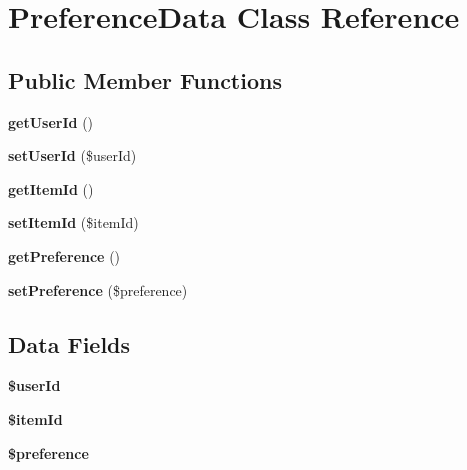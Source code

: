 \hypertarget{class_preference_data}{\section{Preference\+Data Class Reference}
\label{class_preference_data}
}
\subsection*{Public Member Functions}
\begin{DoxyCompactItemize}
\item 
\hypertarget{class_preference_data_a05f6aa1ffae6295260d9f1cca016bf33}{{\bfseries get\+User\+Id} ()}\label{class_preference_data_a05f6aa1ffae6295260d9f1cca016bf33}

\item 
\hypertarget{class_preference_data_aad3264e2196ea03403e62460cd62ff96}{{\bfseries set\+User\+Id} (\$user\+Id)}\label{class_preference_data_aad3264e2196ea03403e62460cd62ff96}

\item 
\hypertarget{class_preference_data_a5b01110117f0cd71a5a115dc8b9eab6f}{{\bfseries get\+Item\+Id} ()}\label{class_preference_data_a5b01110117f0cd71a5a115dc8b9eab6f}

\item 
\hypertarget{class_preference_data_a22de7a673c95892b16b497788139add1}{{\bfseries set\+Item\+Id} (\$item\+Id)}\label{class_preference_data_a22de7a673c95892b16b497788139add1}

\item 
\hypertarget{class_preference_data_a7e7b1aa2f3a60fa96075c163926faae5}{{\bfseries get\+Preference} ()}\label{class_preference_data_a7e7b1aa2f3a60fa96075c163926faae5}

\item 
\hypertarget{class_preference_data_abaceff2adf3ae4d727cb718a455aa72c}{{\bfseries set\+Preference} (\$preference)}\label{class_preference_data_abaceff2adf3ae4d727cb718a455aa72c}

\end{DoxyCompactItemize}
\subsection*{Data Fields}
\begin{DoxyCompactItemize}
\item 
\hypertarget{class_preference_data_a84651f4070d04080f6c5fd3c98cc9104}{{\bfseries \$user\+Id}}\label{class_preference_data_a84651f4070d04080f6c5fd3c98cc9104}

\item 
\hypertarget{class_preference_data_aa4c0908542b0acc0aaa0aadee3df7ae5}{{\bfseries \$item\+Id}}\label{class_preference_data_aa4c0908542b0acc0aaa0aadee3df7ae5}

\item 
\hypertarget{class_preference_data_a80f0ef4ddfea428eec01528af256318c}{{\bfseries \$preference}}\label{class_preference_data_a80f0ef4ddfea428eec01528af256318c}

\end{DoxyCompactItemize}
